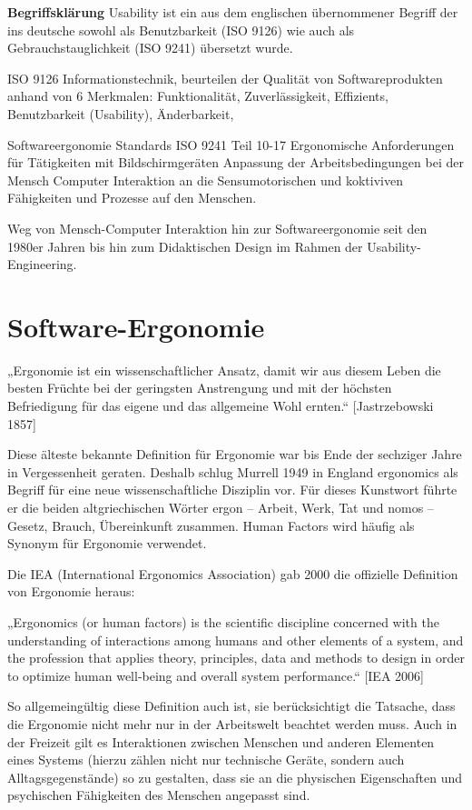 \documentclass[a4paper, 12pt, twoside, BCOR=20mm, DIV=calc, abstracton, parskip=half*, toc=bibliography, toc=listof, headsepline, footsepline, headings=small, numbers=enddot]{scrreprt}
\begin{document}
	\textbf{Begriffsklärung}
	Usability ist ein aus dem englischen übernommener Begriff der ins deutsche sowohl als Benutzbarkeit (ISO 9126) wie auch als Gebrauchstauglichkeit (ISO 9241) übersetzt wurde. 
	
	ISO 9126 Informationstechnik, beurteilen der Qualität von Softwareprodukten anhand von 6 Merkmalen: Funktionalität, Zuverlässigkeit, Effizients, Benutzbarkeit (Usability), Änderbarkeit, 
	
	Softwareergonomie Standards ISO 9241 Teil 10-17 Ergonomische Anforderungen für Tätigkeiten mit Bildschirmgeräten
	Anpassung der Arbeitsbedingungen bei der Mensch Computer Interaktion an die Sensumotorischen und koktiviven Fähigkeiten und Prozesse auf den Menschen.
	
	Weg von Mensch-Computer Interaktion hin zur Softwareergonomie seit den 1980er Jahren bis hin zum Didaktischen Design im Rahmen der Usability-Engineering. 
	
	\section{Software-Ergonomie}
	„Ergonomie ist ein wissenschaftlicher Ansatz, damit wir aus diesem Leben die besten Früchte bei der geringsten Anstrengung und mit der höchsten Befriedigung für das eigene und das allgemeine Wohl ernten.“ [Jastrzebowski 1857]
	
	Diese älteste bekannte Definition für Ergonomie war bis Ende der sechziger Jahre in Vergessenheit geraten. Deshalb schlug Murrell 1949 in England ergonomics als Begriff für eine neue wissenschaftliche Disziplin vor. Für dieses Kunstwort führte er die beiden altgriechischen Wörter ergon – Arbeit, Werk, Tat und nomos – Gesetz, Brauch, Übereinkunft zusammen. Human Factors wird häufig als Synonym für Ergonomie verwendet.
	
	Die IEA (International Ergonomics Association) gab 2000 die offizielle Definition von Ergonomie heraus:
	
	„Ergonomics (or human factors) is the scientific discipline concerned with the understanding of interactions among humans and other elements of a system, and the profession that applies theory, principles, data and methods to design in order to optimize human well-being and overall system performance.“ [IEA 2006]
	
	So allgemeingültig diese Definition auch ist, sie berücksichtigt die Tatsache, dass die Ergonomie nicht mehr nur in der Arbeitswelt beachtet werden muss. Auch in der Freizeit gilt es Interaktionen zwischen Menschen und anderen Elementen eines Systems (hierzu zählen nicht nur technische Geräte, sondern auch Alltagsgegenstände) so zu gestalten, dass sie an die physischen Eigenschaften und psychischen Fähigkeiten des Menschen angepasst sind.
	
\end{document}
